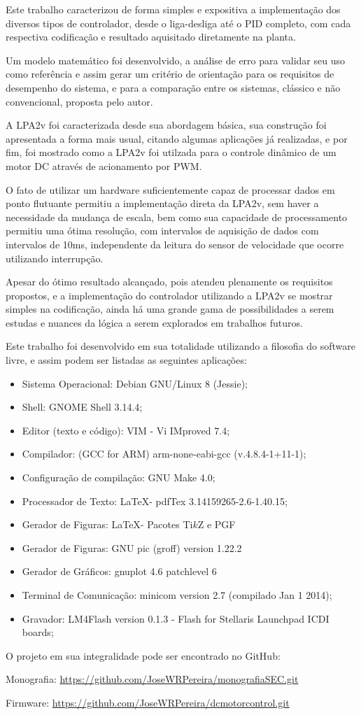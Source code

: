 Este trabalho caracterizou de forma simples e expositiva a 
implementação dos diversos tipos de controlador, 
desde o liga-desliga até o PID completo, 
com cada respectiva codificação e 
resultado aquisitado diretamente na planta. 

Um modelo matemático foi desenvolvido, 
a análise de erro para validar seu uso como referência e assim
gerar um critério de orientação para os requisitos de desempenho do sistema, 
e para a comparação entre os sistemas,
clássico e não convencional, proposta pelo autor.

A LPA2v foi caracterizada desde sua abordagem básica, 
sua construção foi apresentada a forma mais usual, 
citando algumas aplicações já realizadas, e por fim, 
foi mostrado como a LPA2v foi utilzada para o controle dinâmico
 de um motor DC através de acionamento por PWM.

O fato de utilizar um hardware suficientemente capaz de 
processar dados em ponto flutuante 
permitiu a implementação direta da LPA2v, 
sem haver a necessidade da mudança de escala, 
bem como sua capacidade de processamento permitiu uma ótima resolução, 
com intervalos de aquisição de dados com intervalos de 10ms, 
independente da leitura do sensor de velocidade que ocorre utilizando 
interrupção.

Apesar do ótimo resultado alcançado, 
pois atendeu plenamente os requisitos propostos, 
e a implementação do controlador utilizando a LPA2v
se mostrar simples na codificação, 
ainda há uma grande gama de possibilidades a serem estudas e 
nuances da lógica a serem explorados em trabalhos futuros.


Este trabalho foi desenvolvido em sua totalidade 
utilizando a filosofia do software livre, 
e assim podem ser listadas as seguintes aplicações:

\begin{itemize}
\item Sistema Operacional: Debian GNU/Linux 8 (Jessie);
\item Shell: GNOME Shell 3.14.4;
\item Editor (texto e código): VIM - Vi IMproved 7.4;
\item Compilador: (GCC for ARM) arm-none-eabi-gcc (v.4.8.4-1+11-1);
\item Configuração de compilação: GNU Make 4.0;
\item Processador de Texto: \LaTeX  - pdfTex 3.14159265-2.6-1.40.15;
\item Gerador de Figuras: \LaTeX - Pacotes Ti$k$Z e PGF
\item Gerador de Figuras: GNU pic (groff)  version 1.22.2
\item Gerador de Gráficos: gnuplot 4.6 patchlevel 6
\item Terminal de Comunicação: minicom version 2.7 (compilado Jan 1 2014);
\item Gravador: LM4Flash version 0.1.3 - Flash for Stellaris Launchpad ICDI boards;
\end{itemize} 

O projeto em sua integralidade pode ser encontrado no GitHub:

Monografia: \url{https://github.com/JoseWRPereira/monografiaSEC.git}

Firmware: \url{https://github.com/JoseWRPereira/dcmotorcontrol.git}






